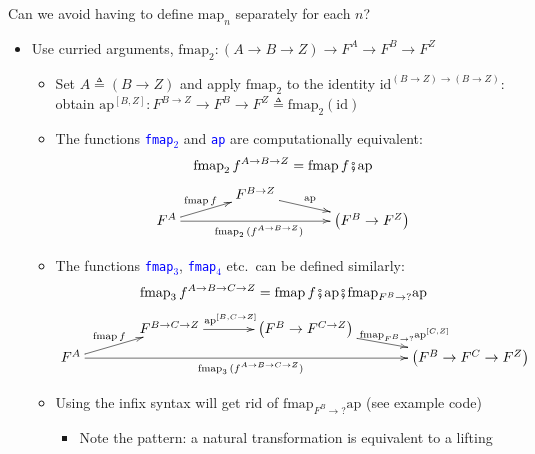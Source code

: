 \vspace{-0.1cm}Can we avoid having to define $\text{map}_{n}$ separately
for each $n$?
\begin{itemize}
\item Use curried arguments, $\text{fmap}_{2}:(A\rightarrow B\rightarrow Z)\rightarrow F^{A}\rightarrow F^{B}\rightarrow F^{Z}$
\begin{itemize}
\item Set $A\triangleq\left(B\rightarrow Z\right)$ and apply $\text{fmap}_{2}$
to the identity $\text{id}^{\left(B\rightarrow Z\right)\rightarrow\left(B\rightarrow Z\right)}$:
obtain $\text{ap}^{[B,Z]}:F^{B\rightarrow Z}\rightarrow F^{B}\rightarrow F^{Z}\triangleq\text{fmap}_{2}\left(\text{id}\right)$
\item The functions \texttt{\textcolor{blue}{\footnotesize{}fmap$_{2}$}}
and \texttt{\textcolor{blue}{\footnotesize{}ap}} are computationally
equivalent:{\footnotesize{}
\[
\text{fmap}_{2}\,f^{A\rightarrow B\rightarrow Z}=\text{fmap}\,f\bef\text{ap}
\]
\[
\xymatrix{\xyScaleY{0.2pc}\xyScaleX{3pc} & F^{B\rightarrow Z}\ar[rd]\sp(0.45){\text{ap}}\\
F^{A}\ar[ru]\sp(0.45){\text{fmap}\,f}\ar[rr]\sb(0.45){\text{fmap}_{2}\,(f^{A\rightarrow B\rightarrow Z})} &  & \left(F^{B}\rightarrow F^{Z}\right)
}
\]
}{\footnotesize\par}
\item The functions \texttt{\textcolor{blue}{\footnotesize{}fmap$_{3}$}},
\texttt{\textcolor{blue}{\footnotesize{}fmap$_{4}$}} etc.\ can be
defined similarly:{\footnotesize{}
\[
\text{fmap}_{3}\,f^{A\rightarrow B\rightarrow C\rightarrow Z}=\text{fmap}\,f\bef\text{ap}\bef\text{fmap}_{F^{B}\rightarrow?}\text{ap}
\]
\[
\xymatrix{\xyScaleY{0.2pc}\xyScaleX{3pc} & F^{B\rightarrow C\rightarrow Z}\ar[r]\sp(0.45){\text{ap}^{[B,C\rightarrow Z]}} & \left(F^{B}\rightarrow F^{C\rightarrow Z}\right)\ar[rd]\sp(0.55){\text{fmap}_{F^{B}\rightarrow?}\text{ap}^{[C,Z]}}\\
F^{A}\ar[ru]\sp(0.45){\text{fmap}\,f}\ar[rrr]\sb(0.45){\text{fmap}_{3}\,(f^{A\rightarrow B\rightarrow C\rightarrow Z})} &  &  & \left(F^{B}\rightarrow F^{C}\rightarrow F^{Z}\right)
}
\]
}{\footnotesize\par}
\item Using the infix syntax will get rid of {\footnotesize{}$\text{fmap}_{F^{B}\rightarrow?}\text{ap}$}
(see example code)
\begin{itemize}
\item Note the pattern: a natural transformation is equivalent to a lifting
\end{itemize}
\end{itemize}
\end{itemize}


